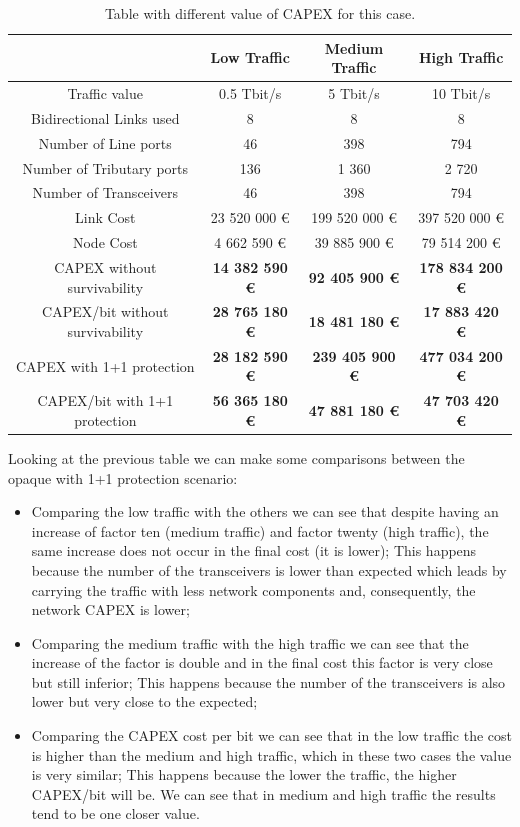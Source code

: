 \begin{table}[H]
\centering
\begin{tabular}{| c | c | c | c |}
 \hline
 & Low Traffic & Medium Traffic & High Traffic \\
 \hline\hline
 Traffic value & 0.5 Tbit/s & 5 Tbit/s & 10 Tbit/s \\ \hline
 Bidirectional Links used & 8 & 8 & 8 \\ \hline
 Number of Line ports & 46 & 398 & 794 \\ \hline
 Number of Tributary ports & 136 & 1 360 & 2 720 \\ \hline
 Number of Transceivers & 46 & 398 & 794 \\ \hline
 Link Cost & 23 520 000 \euro & 199 520 000 \euro & 397 520 000 \euro \\ \hline
 Node Cost & 4 662 590 \euro & 39 885 900 \euro & 79 514 200 \euro \\ \hline
 CAPEX without survivability & \textbf{14 382 590 \euro} & \textbf{92 405 900 \euro} & \textbf{178 834 200 \euro} \\ \hline
 CAPEX/bit without survivability & \textbf{28 765 180 \euro} & \textbf{18 481 180 \euro} & \textbf{17 883 420 \euro} \\ \hline
 CAPEX with 1+1 protection & \textbf{28 182 590 \euro} & \textbf{239 405 900 \euro} & \textbf{477 034 200 \euro} \\ \hline
 CAPEX/bit with 1+1 protection & \textbf{56 365 180 \euro} & \textbf{47 881 180 \euro} & \textbf{47 703 420 \euro} \\
 \hline
\end{tabular}
\caption{Table with different value of CAPEX for this case.}
\label{table_comparative_opaque_protec_heuristic}
\end{table}

Looking at the previous table we can make some comparisons between the opaque with 1+1 protection scenario:

\begin{itemize}
  \item Comparing the low traffic with the others we can see that despite having an increase of factor ten (medium traffic) and factor twenty (high traffic), the same increase does not occur in the final cost (it is lower);
  \subitem This happens because the number of the transceivers is lower than expected which leads by carrying the traffic with less network components and, consequently, the network CAPEX is lower;
  \item Comparing the medium traffic with the high traffic we can see that the increase of the factor is double and in the final cost this factor is very close but still inferior;
  \subitem This happens because the number of the transceivers is also lower but very close to the expected;
  \item Comparing the CAPEX cost per bit we can see that in the low traffic the cost is higher than the medium and high traffic, which in these two cases the value is very similar;
  \subitem This happens because the lower the traffic, the higher CAPEX/bit will be. We can see that in medium and high traffic the results tend to be one closer value.
\end{itemize}

